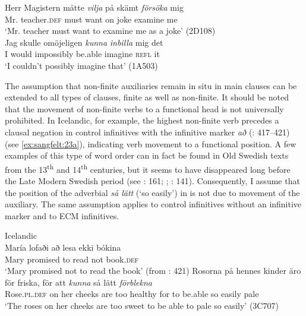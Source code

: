 \documentclass[output=paper, colorlinks, citecolor=brown]{langscibook}
\begin{document}
\ea\label{ex:sangfelt:22}
\ea\label{ex:sangfelt:22a}
\gll Herr Magistern måtte \textit{vilja} {på} {skämt} \textit{försöka} mig \\ %
 Mr. teacher.\textsc{def} must want on joke examine me\\
\glt ‘Mr. teacher must want to examine me as a joke’ (2D108)\\
\ex\label{ex:sangfelt:22b}
\gll Jag skulle {omöjeligen} \textit{kunna} \textit{inbilla} mig det \\
 I would impossibly be.able imagine \textsc{refl} it\\
\glt ‘I couldn’t possibly imagine that’ (1A503)
\z
\z


The assumption that non-finite auxiliaries remain in situ in main clauses can be extended to all types of clauses, finite as well as non-finite. It should be noted that the movement of non-finite verbs to a functional head is not universally prohibited. In Icelandic, for example, the highest non-finite verb precedes a clausal negation in control infinitives with the infinitive marker \textit{að} (\citealt{Thrainsson2007}: 417–421) (see \ref{ex:sangfelt:23a}), indicating verb movement to a functional position. A few examples of this type of word order can in fact be found in Old Swedish texts from the 13\textsuperscript{th} and 14\textsuperscript{th} centuries, but it seems to have disappeared long before the Late Modern Swedish period (see \citealt{Delsing1999}: 161; \citealt{Falk2010Studier}; \citealt{Kalm2016Satsekvivalenta}: 141). Consequently, I assume that the position of the adverbial \textit{så lätt} (‘so easily’) in  is not due to movement of the auxiliary. The same assumption applies to control infinitives without an infinitive marker and to ECM infinitives.


\ea \label{ex:sangfelt:23}
\ea Icelandic\label{ex:sangfelt:23a}\\
\gll María lofaði að lesa {ekki} bókina \\
 Mary promised to read not book.\textsc{def}\\
\glt ‘Mary promised not to read the book’ (from \citealt{Thrainsson2007}: 421)
\ex\label{ex:sangfelt:23b} \gll Rosorna på hennes kinder äro för friska, för att \textit{kunna} så lätt \textit{förblekna} \\
 Rose.\textsc{pl.def} on her cheeks are too healthy for to be.able so easily pale\\
\glt ‘The roses on her cheeks are too sweet to be able to pale so easily’ (3C707)
\z 
\z
\end{document}
